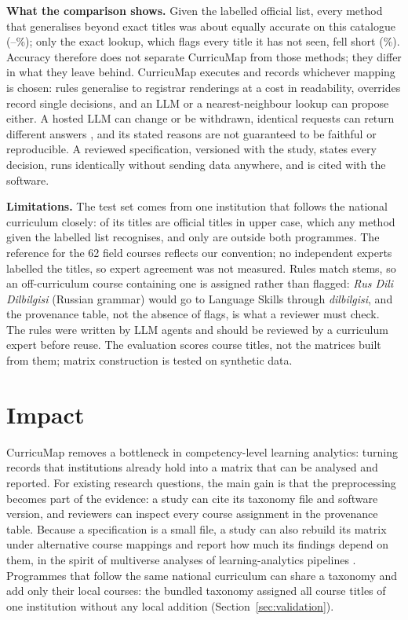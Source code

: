 \documentclass[preprint,12pt,a4paper]{elsarticle}
\begin{document}
\textbf{What the comparison shows.} Given the labelled official list, every method that generalises beyond exact titles was about equally accurate on this catalogue (\listAccMin--\listAccMax\%); only the exact lookup, which flags every title it has not seen, fell short (\lookAcc\%). Accuracy therefore does not separate CurricuMap from those methods; they differ in what they leave behind. CurricuMap executes and records whichever mapping is chosen: rules generalise to registrar renderings at a cost in readability, overrides record single decisions, and an LLM or a nearest-neighbour lookup can propose either. A hosted LLM can change or be withdrawn, identical requests can return different answers \cite{atil2025,reiss2023}, and its stated reasons are not guaranteed to be faithful or reproducible. A reviewed specification, versioned with the study, states every decision, runs identically without sending data anywhere, and is cited with the software.

\textbf{Limitations.} The test set comes from one institution that follows the national curriculum closely: \nExact{} of its \nTitles{} titles are official titles in upper case, which any method given the labelled list recognises, and only \nUnseenW{} are outside both programmes. The reference for the 62 field courses reflects our convention; no independent experts labelled the titles, so expert agreement was not measured. Rules match stems, so an off-curriculum course containing one is assigned rather than flagged: \emph{Rus Dili Dilbilgisi} (Russian grammar) would go to Language Skills through \emph{dilbilgisi}, and the provenance table, not the absence of flags, is what a reviewer must check. The rules were written by LLM agents and should be reviewed by a curriculum expert before reuse. The evaluation scores course titles, not the matrices built from them; matrix construction is tested on synthetic data.

\section{Impact}

CurricuMap removes a bottleneck in competency-level learning analytics: turning records that institutions already hold into a matrix that can be analysed and reported. For existing research questions, the main gain is that the preprocessing becomes part of the evidence: a study can cite its taxonomy file and software version, and reviewers can inspect every course assignment in the provenance table. Because a specification is a small file, a study can also rebuild its matrix under alternative course mappings and report how much its findings depend on them, in the spirit of multiverse analyses of learning-analytics pipelines \cite{tang2025}. Programmes that follow the same national curriculum can share a taxonomy and add only their local courses: the bundled taxonomy assigned all \vTwoCorrect{} course titles of one institution without any local addition (Section~\ref{sec:validation}).
\end{document}
